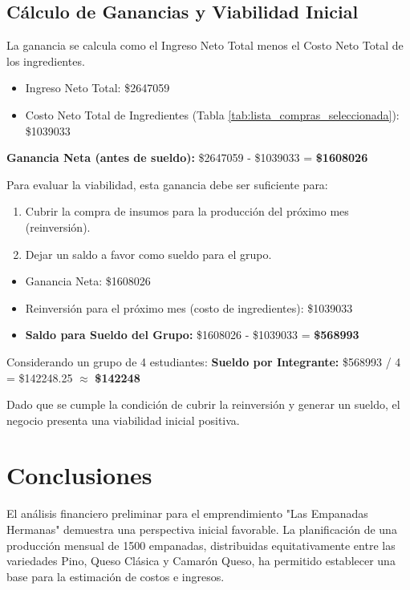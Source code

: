 \documentclass[12pt]{article}
\begin{document}
\subsection{Cálculo de Ganancias y Viabilidad Inicial}
La ganancia se calcula como el Ingreso Neto Total menos el Costo Neto Total de los ingredientes.
\begin{itemize}
    \item Ingreso Neto Total: \$\num{2647059}
    \item Costo Neto Total de Ingredientes (Tabla \ref{tab:lista_compras_seleccionada}): \$\num{1039033}
\end{itemize}
\textbf{Ganancia Neta (antes de sueldo):} \$\num{2647059} - \$\num{1039033} = \textbf{\$\num{1608026}}

Para evaluar la viabilidad, esta ganancia debe ser suficiente para:
\begin{enumerate}
    \item Cubrir la compra de insumos para la producción del próximo mes (reinversión).
    \item Dejar un saldo a favor como sueldo para el grupo.
\end{enumerate}
\begin{itemize}
    \item Ganancia Neta: \$\num{1608026}
    \item Reinversión para el próximo mes (costo de ingredientes): \$\num{1039033}
    \item \textbf{Saldo para Sueldo del Grupo:} \$\num{1608026} - \$\num{1039033} = \textbf{\$\num{568993}}
\end{itemize}
Considerando un grupo de 4 estudiantes:
\textbf{Sueldo por Integrante:} \$\num{568993} / 4 = \$\num{142248.25} $\approx$ \textbf{\$\num{142248}}

Dado que se cumple la condición de cubrir la reinversión y generar un sueldo, el negocio presenta una viabilidad inicial positiva.

\newpage
\section{Conclusiones} %
El análisis financiero preliminar para el emprendimiento "Las Empanadas Hermanas" demuestra una perspectiva inicial favorable. La planificación de una producción mensual de 1500 empanadas, distribuidas equitativamente entre las variedades Pino, Queso Clásica y Camarón Queso, ha permitido establecer una base para la estimación de costos e ingresos.
\end{document}
